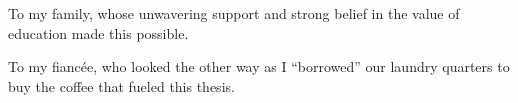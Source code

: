 \thispagestyle{empty}

\vspace*{3cm}

\begin{center}
To my family, whose unwavering support and strong belief in the value of education made this possible.
\end{center}

\medskip

\begin{center}
To my fianc\'{e}e, who looked the other way as I ``borrowed'' our laundry quarters to buy the coffee that fueled this thesis.
\end{center}



